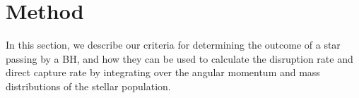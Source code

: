 \documentclass[useAMS,usenatbib]{mn2e}
\begin{document}
\section{Method}\label{sec:method}

In this section, we describe our criteria for determining the outcome of a star passing by a BH, and how they can be used to calculate the disruption rate and direct capture rate by integrating over the angular momentum and mass distributions of the stellar population.


\end{document}
